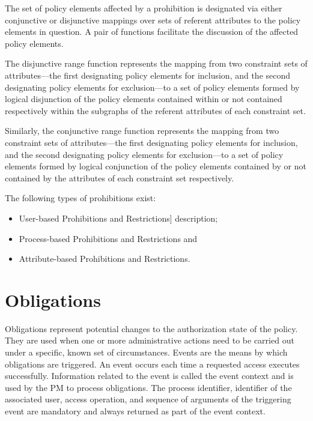 \documentclass[12pt,a4paper,titlepage]{book}
\begin{document}
	The set of policy elements affected by a prohibition is designated via either conjunctive or disjunctive mappings over sets of referent attributes to the policy elements in question. A pair of functions facilitate the discussion of the affected policy elements. 
	
	The disjunctive range function represents the mapping from two constraint sets of attributes—the first designating policy elements for inclusion, and the second designating policy elements for exclusion—to a set of policy elements formed by logical disjunction of the policy elements contained within or not contained respectively within the subgraphs of the referent attributes of each constraint set. 
	
	Similarly, the conjunctive range function represents the mapping from two constraint sets of attributes—the first designating policy elements for inclusion, and the second designating policy elements for exclusion—to a set of policy elements formed by logical conjunction of the policy elements contained by or not contained by the attributes of each constraint set respectively.
	
	The following types of prohibitions exist:
	
	\begin{itemize}
		\item User-based Prohibitions and Restrictions] description;
		\item Process-based Prohibitions and Restrictions and
		\item Attribute-based Prohibitions and Restrictions.
	\end{itemize}		
		
	\section{Obligations}
	
	Obligations represent potential changes to the authorization state of the policy. They are used when one or more administrative actions need to be carried out under a specific, known set of circumstances. Events are the means by which obligations are triggered. An event occurs each time a requested access executes successfully. Information related to the event is called the event context and is used by the PM to process obligations. The process identifier, identifier of the associated user, access operation, and sequence of arguments of the triggering event are mandatory and always returned as part of the event context.
	
\end{document}
